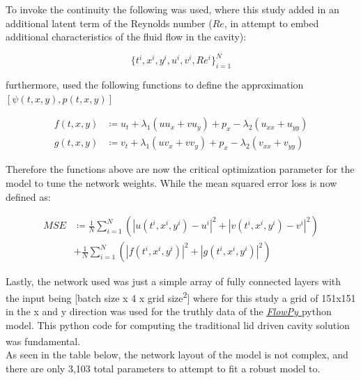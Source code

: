 \documentclass{article}
\begin{document}
\noindent To invoke the continuity  the following was used, where this
study added in an additional latent term of the Reynolds number ($Re$, in
attempt to embed additional characteristics of the fluid flow in the cavity):

\begin{equation}
	\{t^i, x^i, y^i, u^i, v^i, Re^i\}^{N}_{i=1}
\end{equation}

\noindent furthermore, \citeauthor{DBLP:journals/corr/abs-1711-10566}
used the following functions to define the approximation $\left[ \psi(t,x,y),
		p(t,x,y)\right]$

\begin{equation}
	\begin{aligned}
		f(t,x,y) & \coloneqq u_t + \lambda_1 ( u u_x + v u_y) +
		p_x - \lambda_{2}(u_{xx} + u_{yy})                      \\
		g(t,x,y) & \coloneqq v_t + \lambda_1 ( u v_x + v v_y) +
		p_x - \lambda_{2}(v_{xx} + v_{yy})
	\end{aligned}
\end{equation}

\noindent Therefore the functions above are now the critical
optimization parameter for the model to tune the network weights. While the
mean squared error loss is now defined as:

\begin{align}
	MSE & \coloneqq \frac{1}{N} \sum_{i=1}^{N} ( |u(t^i,x^i,y^i) -
	u^i |^2 + | v(t^i,x^i,y^i) - v^i |^2)                          \\
	    & + \frac{1}{N} \sum_{i=1}^{N} ( |f(t^i,x^i,y^i)|^2 + |
	g(t^i,x^i,y^i)|^2)
\end{align}

\noindent Lastly, the network used was just a simple array of fully
connected layers with the input being [batch size x 4 x grid
		size\textsuperscript{2}] where for this study a grid of 151x151
in the x and y
direction was used for the truthly data of the
\textit{\underline{\href{https://github.com/gauravsdeshmukh/FlowPy}{FlowPy} }}
python model. This python code for computing the traditional lid driven cavity
solution was fundamental.\textsuperscript{\cite{Barba2019, FlowPy}} \\

\noindent As seen in the table below, the network layout of the model
is not complex, and there are only 3,103 total parameters to attempt to fit a
robust model to. \\
\end{document}
